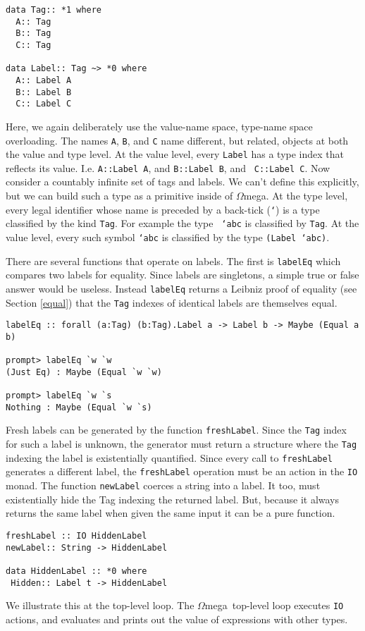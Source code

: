 \documentclass[11pt,twoside,A4]{llncs}
\newcommand{\om}{\emph{$\Omega$}mega}
\begin{document}
{\small
\begin{verbatim}
data Tag:: *1 where
  A:: Tag
  B:: Tag
  C:: Tag

data Label:: Tag ~> *0 where
  A:: Label A
  B:: Label B
  C:: Label C
\end{verbatim}}

Here, we again deliberately use the value-name space, type-name space
overloading. The names {\tt A}, {\tt B}, and {\tt C} name different,
but related, objects at both the value and type level.
At the value level, every {\tt Label} has a type index
that reflects its value. I.e. {\tt A::Label A}, and {\tt B::Label B}, and {\tt
C::Label C}. Now consider a countably infinite set of tags and labels. We can't
define this explicitly, but we can build such a type as a primitive inside of
\om. At the type level, every legal identifier whose name is preceded by a
back-tick ({\tt `}) is a type classified by the kind {\tt Tag}. For example the type {\tt
`abc} is classified by {\tt Tag}. At the value level, every such symbol {\tt `abc} is classified
by the type {\tt (Label `abc)}.

There are several functions that operate on labels. The first is
{\tt labelEq} which compares two labels for equality. Since labels
are singletons, a simple true or false answer would be useless.
Instead {\tt labelEq} returns a Leibniz proof of equality 
(see Section \ref{equal}) that the {\tt Tag}
indexes of identical labels are themselves equal.

{\small
\begin{verbatim}
labelEq :: forall (a:Tag) (b:Tag).Label a -> Label b -> Maybe (Equal a b)

prompt> labelEq `w `w
(Just Eq) : Maybe (Equal `w `w)

prompt> labelEq `w `s
Nothing : Maybe (Equal `w `s)
\end{verbatim}}

Fresh labels can be generated by the function {\tt freshLabel}.
Since the {\tt Tag} index for such a label is unknown, the generator
must return a structure where the
{\tt Tag} indexing the label is existentially quantified. Since every call
to {\tt freshLabel} generates a different label, the {\tt freshLabel}
operation must be an action in the {\tt IO} monad. The function
{\tt newLabel} coerces a string into a label. It too, must
existentially hide the Tag indexing the returned label. But,
because it always returns the same label when given the same input
it can be a pure function.

{\small
\begin{verbatim}
freshLabel :: IO HiddenLabel
newLabel:: String -> HiddenLabel

data HiddenLabel :: *0 where 
 Hidden:: Label t -> HiddenLabel
\end{verbatim}}
We illustrate this at the top-level loop. The \om\ top-level loop executes
{\tt IO} actions, and evaluates and prints
out the value of expressions with other types.
\end{document}
